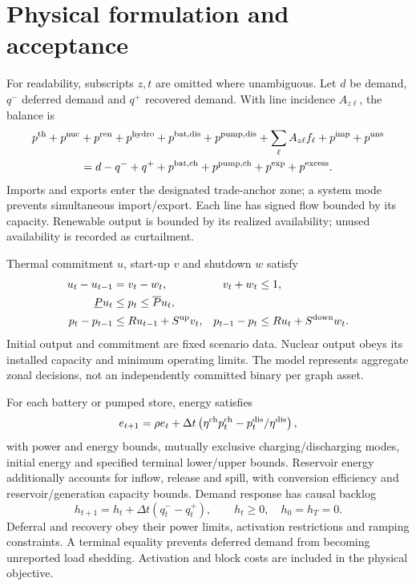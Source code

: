 \section{Physical formulation and acceptance}
\label{app:physical}
For readability, subscripts $z,t$ are omitted where unambiguous. Let $d$ be
demand, $q^-$ deferred demand and $q^+$ recovered demand. With line incidence
$A_{z\ell}$, the balance is
\begin{multline}
 p^{\rm th}+p^{\rm nuc}+p^{\rm ren}+p^{\rm hydro}
 +p^{\rm bat,dis}+p^{\rm pump,dis}
 +\sum_\ell A_{z\ell}f_\ell+p^{\rm imp}+p^{\rm uns}\\
 =d-q^-+q^++p^{\rm bat,ch}+p^{\rm pump,ch}+p^{\rm exp}+p^{\rm excess}.
\end{multline}
Imports and exports enter the designated trade-anchor zone; a system mode
prevents simultaneous import/export. Each line has signed flow bounded by
its capacity. Renewable output is bounded by its realized availability;
unused availability is recorded as curtailment.

Thermal commitment $u$, start-up $v$ and shutdown $w$ satisfy
\begin{align}
 u_t-u_{t-1}&=v_t-w_t,&v_t+w_t&\leq1,\\
 \underline P u_t&\leq p_t\leq\overline P u_t,\\
 p_t-p_{t-1}&\leq R u_{t-1}+S^{\rm up}v_t,&
 p_{t-1}-p_t&\leq R u_t+S^{\rm down}w_t.
\end{align}
Initial output and commitment are fixed scenario data. Nuclear output obeys
its installed capacity and minimum operating limits. The model represents
aggregate zonal decisions, not an independently committed binary per graph asset.

For each battery or pumped store, energy satisfies
\begin{equation}
 e_{t+1}=\rho e_t+\Delta t\left(\eta^{\rm ch}p_t^{\rm ch}
                        -p_t^{\rm dis}/\eta^{\rm dis}\right),
\end{equation}
with power and energy bounds, mutually exclusive charging/discharging modes,
initial energy and specified terminal lower/upper bounds. Reservoir energy
additionally accounts for inflow, release and spill, with conversion
efficiency and reservoir/generation capacity bounds.
Demand response has causal backlog
\begin{equation}
 h_{t+1}=h_t+\Delta t(q_t^--q_t^+),\qquad h_t\geq0,\quad h_0=h_T=0.
\end{equation}
Deferral and recovery obey their power limits, activation restrictions and
ramping constraints. A terminal equality prevents deferred demand from
becoming unreported load shedding. Activation and block costs are included
in the physical objective.

